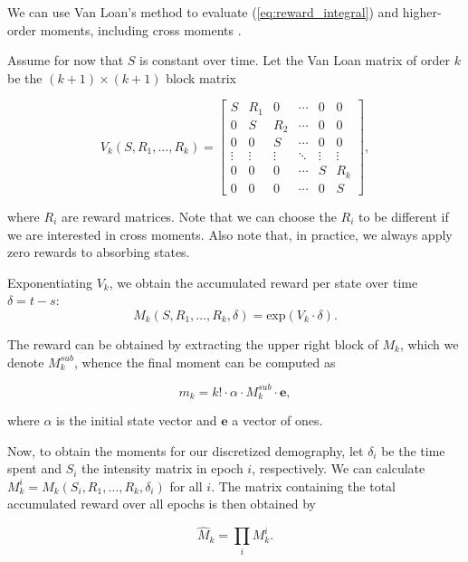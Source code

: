 \documentclass[hidelinks,11pt]{article}
\begin{document}
We can use Van Loan's method to evaluate (\ref{eq:reward_integral}) and higher-order moments, including cross moments \citep{van_loan_popgen,van_loan}.

Assume for now that $S$ is constant over time. Let the Van Loan matrix of order $k$ be the $(k+1) \times (k+1)$ block matrix

\begin{equation*}
    V_{k}(S, R_1, \dots, R_k) = 
\begin{bmatrix}
    S & R_1 & 0 & \cdots & 0 & 0 \\
    0 & S & R_2 & \cdots & 0 & 0 \\
    0 & 0 & S & \cdots & 0 & 0 \\
    \vdots & \vdots & \vdots & \ddots & \vdots & \vdots \\
    0 & 0 & 0 & \cdots & S & R_k \\
    0 & 0 & 0 & \cdots & 0 & S
\end{bmatrix},
\end{equation*}

where $R_i$ are reward matrices. Note that we can choose the $R_i$ to be different if we are interested in cross moments. Also note that, in practice, we always apply zero rewards to absorbing states. 

Exponentiating $V_k$, we obtain the accumulated reward per state over time $\delta = t - s$:
\begin{equation*}
    M_k(S, R_1, \dots, R_k,\delta) = \text{exp}(V_k \cdot \delta).
\end{equation*}

The reward can be obtained by extracting the upper right block of $M_k$, which we denote $M_k^{sub}$, whence the final moment can be computed as

\begin{equation*}
m_k = k! \cdot \alpha \cdot M_k^{sub} \cdot \mathbf{e},
\end{equation*}

where $\alpha$ is the initial state vector and $\mathbf{e}$ a vector of ones.

Now, to obtain the moments for our discretized demography, let $\delta_i$ be the time spent and $S_i$ the intensity matrix in epoch $i$, respectively. We can calculate $M_k^i = M_k(S_i, R_1, \dots, R_k,\delta_i)$ for all $i$. The matrix containing the total accumulated reward over all epochs is then obtained by

\begin{equation}\label{eq:prod_moments}
\hat{M}_k = \prod_i{M_k^i}.
\end{equation}
\end{document}
